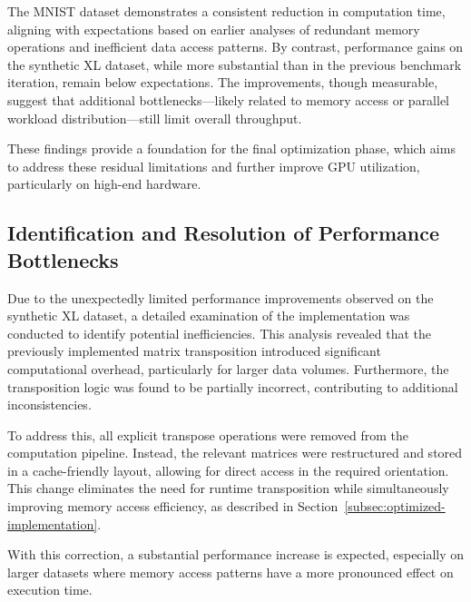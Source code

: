 \documentclass[modern,longauthor]{aastex7}
\begin{document}
The MNIST dataset demonstrates a consistent reduction in computation time, aligning with expectations based on earlier analyses of redundant memory operations and inefficient data access patterns. By contrast, performance gains on the synthetic XL dataset, while more substantial than in the previous benchmark iteration, remain below expectations. The improvements, though measurable, suggest that additional bottlenecks—likely related to memory access or parallel workload distribution—still limit overall throughput.

These findings provide a foundation for the final optimization phase, which aims to address these residual limitations and further improve GPU utilization, particularly on high-end hardware.
\subsection{Identification and Resolution of Performance Bottlenecks}\label{subsec:cuda-error-fixing}
Due to the unexpectedly limited performance improvements observed on the synthetic XL dataset, a detailed examination of the implementation was conducted to identify potential inefficiencies. This analysis revealed that the previously implemented matrix transposition introduced significant computational overhead, particularly for larger data volumes. Furthermore, the transposition logic was found to be partially incorrect, contributing to additional inconsistencies.

To address this, all explicit transpose operations were removed from the computation pipeline. Instead, the relevant matrices were restructured and stored in a cache-friendly layout, allowing for direct access in the required orientation. This change eliminates the need for runtime transposition while simultaneously improving memory access efficiency, as described in Section~\ref{subsec:optimized-implementation}.

With this correction, a substantial performance increase is expected, especially on larger datasets where memory access patterns have a more pronounced effect on execution time.
\end{document}
